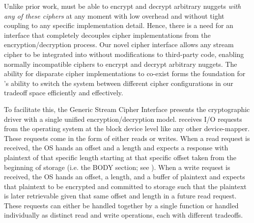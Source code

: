 Unlike prior work, \sys must be able to encrypt and decrypt
arbitrary nuggets \emph{with any of these ciphers} at any moment with
low overhead and without tight coupling to any specific implementation
detail. Hence, there is a need for an interface that completely
decouples cipher implementations from the encryption/decryption
process.  Our novel cipher interface allows any stream
cipher to be integrated into \sys without modifications to
third-party code, enabling normally incompatible ciphers to encrypt
and decrypt arbitrary nuggets. The ability for disparate cipher
implementations to co-exist forms the foundation for \sys's
ability to switch the system between different cipher configurations
in our tradeoff space efficiently and effectively.  

To facilitate this, the Generic Stream Cipher Interface presents the
cryptographic driver with a single unified encryption/decryption model.
\sys receives I/O requests from the operating system at the block device
level like any other device-mapper. These requests come in the form of either
reads or writes. When a read request is received, the OS hands \sys an
offset and a length and expects a response with plaintext of that specific
length starting at that specific offset taken from the beginning of storage
(i.e. the BODY section; see ). When a write request is
received, the OS hands \sys an offset, a length, and a buffer of
plaintext and expects that plaintext to be encrypted and committed to storage
such that the plaintext is later retrievable given that same offset and length
in a future read request. These requests can either be handled together by a
single function or handled individually as distinct read and write operations,
each with different tradeoffs.

